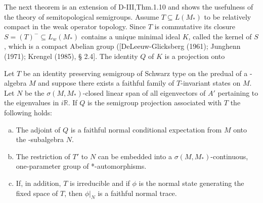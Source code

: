 The next theorem is an extension of D-III,Thm.1.10 and shows the usefulness of the theory of semitopological semigroups.
Assume $T \subseteq L(M_{*})$ to be relatively compact in the weak operator topology.
Since $T$ is commutative its closure $S = (T)^{-} \subseteq L_{w}(M_{*})$ contains a unique minimal ideal $K$, called the kernel of $S$, which is a compact Abelian group ([DeLeeuw-Glicksberg (1961); Junghenn (1971); Krengel (1985), § 2.4].
The identity $Q$ of $K$ is a projection onto

\newpage

\begin{theorem}\label{thm:d4-3.5}
Let $T$ be an identity preserving semigroup of Schwarz type on the predual of a \WA-algebra $M$ and suppose there exists a faithful family of $T$-invariant states on $M$.
Let $N$ be the $\sigma(M,M_{*})$-closed linear span of all eigenvectors of $A'$ pertaining to the eigenvalues in $i\mathbb{R}$.
If $Q$ is the semigroup projection associated with $T$ the following holds:

\begin{enumerate}[(a)]
\item
The adjoint of $Q$ is a faithful normal conditional expectation from $M$ onto the \WA-subalgebra $N$.

\item
The restriction of $T'$ to $N$ can be embedded into a $\sigma(M,M_{*})$-continuous, one-parameter group of *-automorphisms.

\item
If, in addition, $T$ is irreducible and if $\phi$ is the normal state generating the fixed space of $T$, then $\phi|_{N}$ is a faithful normal trace.
\end{enumerate}
\end{theorem}

